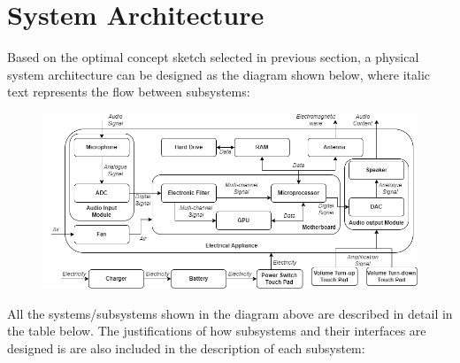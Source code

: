 \documentclass{article}
\begin{document}
\section{System Architecture}
Based on the optimal concept sketch selected in previous section, a physical system architecture can be designed as the diagram shown below, where italic text represents the flow between subsystems:\\
\begin{figure}[H]
\centering
    \includegraphics[scale=0.46]{Architecture}
\end{figure}
All the systems/subsystems shown in the diagram above are described in detail in the table below. The justifications of how subsystems and their interfaces are designed is are also included in the description of each subsystem:
\end{document}
